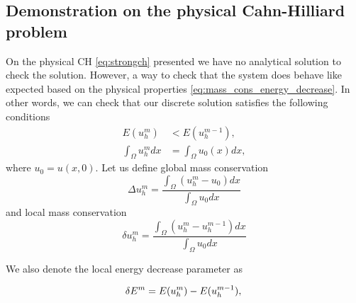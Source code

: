 \subsection{Demonstration on the physical Cahn-Hilliard problem}%
\label{sub:demonstration_on_the_physical_cahn_hilliard}

On the physical CH \eqref{eq:strongch} presented we have no analytical solution to check the solution. However, a way to check that the system does behave like expected based on the physical properties \eqref{eq:mass_cons_energy_decrease}. In other
words, we can check that our discrete solution satisfies the following conditions \[
    \begin{split}
 E( u_{h}^{m}) & <  E( u_{h}^{m-1}),  \\
\int_{\Omega }^{} u_{h}^{m}   dx & = \int_{\Omega }^{} u_{0}(x)  dx,
    \end{split}
\]
where $u_{0} = u( x,0) $. Let us define global mass conservation
\[
 \Delta u_{h}^{m} = \frac{ \int_{\Omega }^{}  ( u_h^{m} - u_{0} ) dx}{ \int_{\Omega }^{}  u_{0} dx}
\]
and local mass conservation
\[
 \delta u_{h}^{m} = \frac{ \int_{\Omega }^{}  ( u_h^{m} - u^{m-1}_{h} ) dx}{ \int_{\Omega }^{}  u_{0} dx}
\]

We also denote the local energy decrease parameter as

\begin{equation}
 \delta E^{m} = E( u_{h}^{m}) -  E( u_{h}^{m-1}),  \\
\end{equation}

